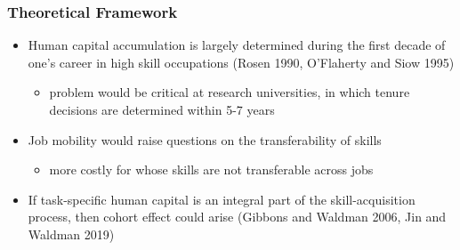 \documentclass[11pt]{beamer}
\begin{document}
\begin{frame}
	\frametitle{Theoretical Framework}
	\begin{itemize}
		\item Human capital accumulation is largely determined during the first decade of one's career in high skill occupations (Rosen 1990, O'Flaherty and Siow 1995)
		\begin{itemize}
			\item problem would be critical at research universities, in which tenure decisions are determined within 5-7 years
		\end{itemize}
		\vspace{1.5 mm}
		\item Job mobility would raise  questions on the transferability of skills 
		\begin{itemize}
			\item more costly for  whose skills are not transferable across jobs
		\end{itemize}
			\vspace{1.5 mm}
		\item If task-specific human capital is an integral part of the skill-acquisition process, then cohort effect could arise (Gibbons and Waldman 2006, Jin and Waldman 2019)
	\end{itemize}
\end{frame}
\end{document}

